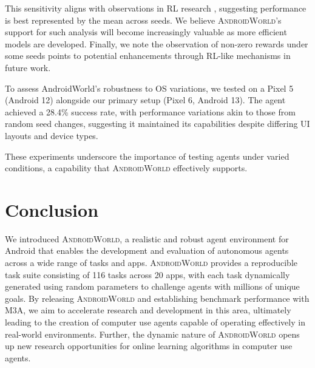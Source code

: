 \documentclass{article}
\newcommand{\system}{\textsc{AndroidWorld}\xspace}
\newcommand{\agent}{\textsc{M3A}\xspace}
\newcommand{\ntasks}{116\xspace}
\newcommand{\napps}{20\xspace}
\begin{document}
This sensitivity aligns with observations in RL research \citep{henderson2018deep, raffin2021stable, colas2018many}, suggesting performance is best represented by the mean across seeds. We believe \system's support for such analysis will become increasingly valuable as more efficient models are developed. Finally, we note the observation of non-zero rewards under some seeds points to potential enhancements through RL-like mechanisms in future work. 

To assess AndroidWorld’s robustness to OS variations, we tested on a Pixel 5 (Android 12) alongside our primary setup (Pixel 6, Android 13). The agent achieved a 28.4\% success rate, with performance variations akin to those from random seed changes, suggesting it maintained its capabilities despite differing UI layouts and device types.

These experiments underscore the importance of testing agents under varied conditions, a capability that \system effectively supports.

\section{Conclusion}

We introduced \system, a realistic and robust agent environment for Android that enables the development and evaluation of autonomous agents across a wide range of tasks and apps. \system provides a reproducible task suite consisting of \ntasks tasks across \napps apps, with each task dynamically generated using random parameters to challenge agents with millions of unique goals. By releasing \system and establishing benchmark performance with \agent, we aim to accelerate research and development in this area, ultimately leading to the creation of computer use agents capable of operating effectively in real-world environments. Further, the dynamic nature of \system opens up new research opportunities for online learning algorithms in computer use agents. 

%


\end{document}
